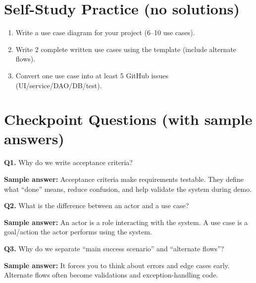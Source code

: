 \documentclass[11pt]{article}
\begin{document}
\section{Self-Study Practice (no solutions)}
\begin{enumerate}
  \item Write a use case diagram for your project (6--10 use cases).
  \item Write 2 complete written use cases using the template (include alternate flows).
  \item Convert one use case into at least 5 GitHub issues (UI/service/DAO/DB/test).
\end{enumerate}

\section{Checkpoint Questions (with sample answers)}
\textbf{Q1.} Why do we write acceptance criteria?\par
\textbf{Sample answer:} Acceptance criteria make requirements testable. They define what ``done'' means, reduce confusion, and help validate the system during demo.

\vspace{0.6em}
\textbf{Q2.} What is the difference between an actor and a use case?\par
\textbf{Sample answer:} An actor is a role interacting with the system. A use case is a goal/action the actor performs using the system.

\vspace{0.6em}
\textbf{Q3.} Why do we separate ``main success scenario'' and ``alternate flows''?\par
\textbf{Sample answer:} It forces you to think about errors and edge cases early. Alternate flows often become validations and exception-handling code.
\end{document}
